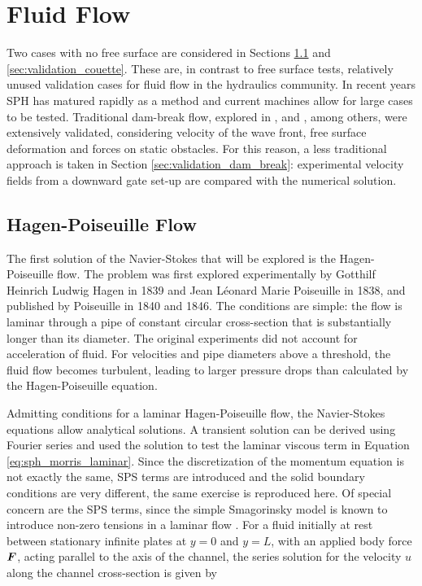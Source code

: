 \section{Fluid Flow}
\label{sec:NS_validation}


Two cases with no free surface are considered in Sections \ref{sec:validation_poiseille} and \ref{sec:validation_couette}. These are, in contrast to free surface tests, relatively unused validation cases for fluid flow in the hydraulics community. In recent years \ac{SPH} has matured rapidly as a method and current machines allow for large cases to be tested. Traditional dam-break flow, explored in \cite{Crespo-2007}, \cite{Violeau-2007} and \cite{Gomez-Gesteira-2010}, among others, were extensively validated, considering velocity of the wave front, free surface deformation and forces on static obstacles. For this reason, a less traditional approach is taken in Section \ref{sec:validation_dam_break}: experimental velocity fields from a downward gate set-up are compared with the numerical solution.

\subsection{Hagen-Poiseuille Flow}
\label{sec:validation_poiseille}

The first solution of the Navier-Stokes that will be explored is the Hagen-Poiseuille flow. The problem was first explored experimentally by Gotthilf Heinrich Ludwig Hagen in 1839 and Jean L\'{e}onard Marie Poiseuille in 1838, and published by Poiseuille in 1840 and 1846. The conditions are simple: the flow is laminar through a pipe of constant circular cross-section that is substantially longer than its diameter. The original experiments did not account for acceleration of fluid. For velocities and pipe diameters above a threshold, the fluid flow becomes turbulent, leading to larger pressure drops than calculated by the Hagen-Poiseuille equation.

Admitting conditions for a laminar Hagen-Poiseuille flow, the Navier-Stokes equations allow analytical solutions. A transient solution can be derived using Fourier series \citep{Drazin-2006} and \cite{Morris-1997} used the solution to test the laminar viscous term in Equation \eqref{eq:sph_morris_laminar}. Since the discretization of the momentum equation is not exactly the same, SPS terms are introduced and the solid boundary conditions are very different, the same exercise is reproduced here. Of special concern are the SPS terms, since the simple Smagorinsky model is known to introduce non-zero tensions in a laminar flow \citep{Batchelor-2000}. For a fluid initially at rest between stationary infinite plates at $y=0$ and $y=L$, with an applied body force $\boldsymbol{F}$, acting parallel to the axis of the channel, the series solution for the velocity $u$ along the channel cross-section is given by 

